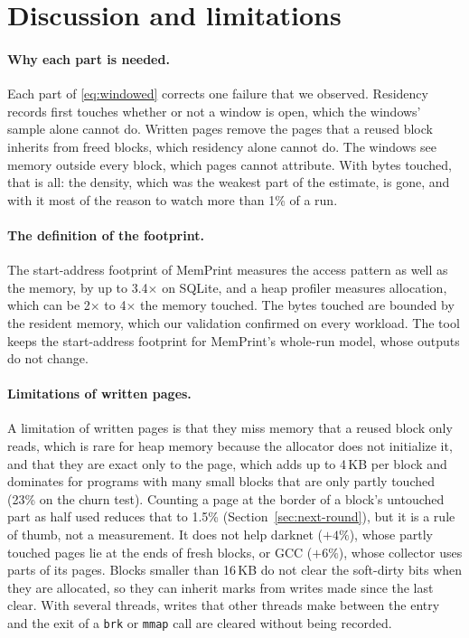 \documentclass[11pt]{article}
\newcommand{\memprint}{MemPrint}
\newcommand{\secref}[1]{Section~\ref{#1}}
\begin{document}
\section{Discussion and limitations}
\label{sec:discussion}

\paragraph{Why each part is needed.}
Each part of \eqref{eq:windowed} corrects one failure that we observed. Residency records first touches whether or not a window is open, which the windows' sample alone cannot do. Written pages remove the pages that a reused block inherits from freed blocks, which residency alone cannot do. The windows see memory outside every block, which pages cannot attribute. With bytes touched, that is all: the density, which was the weakest part of the estimate, is gone, and with it most of the reason to watch more than 1\% of a run.

\paragraph{The definition of the footprint.}
The start-address footprint of \memprint{} measures the access pattern as well as the memory, by up to 3.4$\times$ on SQLite, and a heap profiler measures allocation, which can be 2$\times$ to 4$\times$ the memory touched. The bytes touched are bounded by the resident memory, which our validation confirmed on every workload. The tool keeps the start-address footprint for \memprint{}'s whole-run model, whose outputs do not change.

\paragraph{Limitations of written pages.}
A limitation of written pages is that they miss memory that a reused block only reads, which is rare for heap memory because the allocator does not initialize it, and that they are exact only to the page, which adds up to 4\,KB per block and dominates for programs with many small blocks that are only partly touched (23\% on the churn test). Counting a page at the border of a block's untouched part as half used reduces that to 1.5\% (\secref{sec:next-round}), but it is a rule of thumb, not a measurement. It does not help darknet ($+4\%$), whose partly touched pages lie at the ends of fresh blocks, or GCC ($+6\%$), whose collector uses parts of its pages. Blocks smaller than 16\,KB do not clear the soft-dirty bits when they are allocated, so they can inherit marks from writes made since the last clear. With several threads, writes that other threads make between the entry and the exit of a \texttt{brk} or \texttt{mmap} call are cleared without being recorded.
\end{document}
